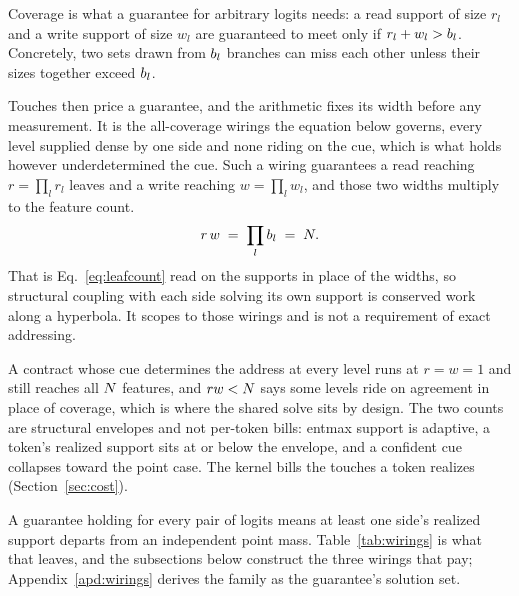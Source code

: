 Coverage is what a guarantee for arbitrary logits needs: a read support of size $r_l$ and a write support of size $w_l$ are guaranteed to meet only if $r_l + w_l > b_l$. Concretely, two sets drawn from $b_l$ branches can miss each other unless their sizes together exceed $b_l$.

Touches then price a guarantee, and the arithmetic fixes its width before any measurement. It is the all-coverage wirings the equation below governs, every level supplied dense by one side and none riding on the cue, which is what holds however underdetermined the cue. Such a wiring guarantees a read reaching $r = \prod_l r_l$ leaves and a write reaching $w = \prod_l w_l$, and those two widths multiply to the feature count.
\begin{align}
  r \, w \;=\; \prod_l b_l \;=\; N .
  \label{eq:touchproduct}
\end{align}
That is Eq.~\eqref{eq:leafcount} read on the supports in place of the widths, so structural coupling with each side solving its own support is conserved work along a hyperbola. It scopes to those wirings and is not a requirement of exact addressing.

A contract whose cue determines the address at every level runs at $r = w = 1$ and still reaches all $N$ features, and $r w < N$ says some levels ride on agreement in place of coverage, which is where the shared solve sits by design. The two counts are structural envelopes and not per-token bills: entmax support is adaptive, a token's realized support sits at or below the envelope, and a confident cue collapses toward the point case. The kernel bills the touches a token realizes (Section~\ref{sec:cost}).

A guarantee holding for every pair of logits means at least one side's realized support departs from an independent point mass. Table~\ref{tab:wirings} is what that leaves, and the subsections below construct the three wirings that pay; Appendix~\ref{apd:wirings} derives the family as the guarantee's solution set.

